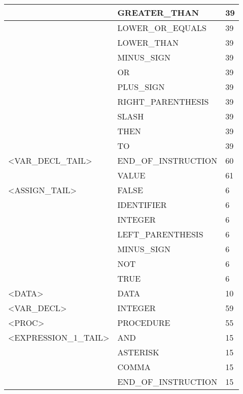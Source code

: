 \begin{longtable}{|l|l|l|}
                     &   GREATER\_THAN         &   39 \\ \hline
                     &   LOWER\_OR\_EQUALS      &   39 \\ \hline
                     &   LOWER\_THAN           &   39 \\ \hline
                     &   MINUS\_SIGN           &   39 \\ \hline
                     &   OR                   &   39 \\ \hline
                     &   PLUS\_SIGN            &   39 \\ \hline
                     &   RIGHT\_PARENTHESIS    &   39 \\ \hline
                     &   SLASH                &   39 \\ \hline
                     &   THEN                 &   39 \\ \hline
                     &   TO                   &   39 \\ \hline
<VAR\_DECL\_TAIL>      &   END\_OF\_INSTRUCTION   &   60 \\ \hline
                     &   VALUE                &   61 \\ \hline
<ASSIGN\_TAIL>        &   FALSE                &   6 \\ \hline
                     &   IDENTIFIER           &   6 \\ \hline
                     &   INTEGER              &   6 \\ \hline
                     &   LEFT\_PARENTHESIS     &   6 \\ \hline
                     &   MINUS\_SIGN           &   6 \\ \hline
                     &   NOT                  &   6 \\ \hline
                     &   TRUE                 &   6 \\ \hline
<DATA>               &   DATA                 &   10 \\ \hline
<VAR\_DECL>           &   INTEGER              &   59 \\ \hline
<PROC>               &   PROCEDURE            &   55 \\ \hline
<EXPRESSION\_1\_TAIL>  &   AND                  &   15 \\ \hline
                     &   ASTERISK             &   15 \\ \hline
                     &   COMMA                &   15 \\ \hline
                     &   END\_OF\_INSTRUCTION   &   15 \\ \hline

\end{longtable}
